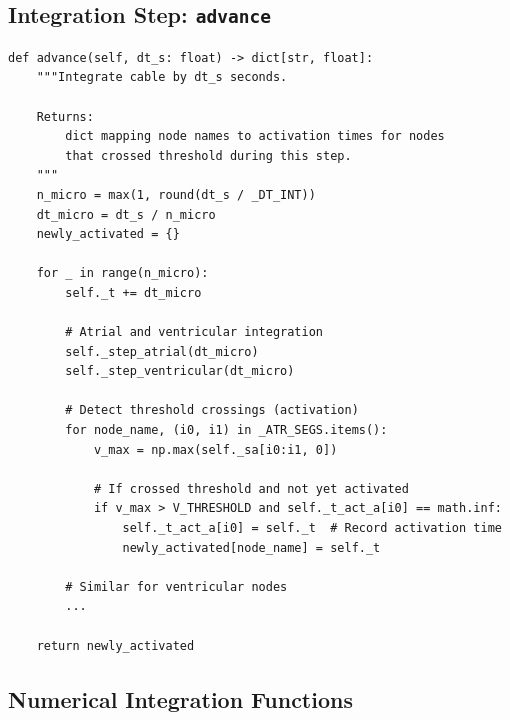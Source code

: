 \documentclass[12pt,a4paper,oneside]{book}
\begin{document}
\subsection{Integration Step: \texttt{advance}}

\begin{Verbatim}[formatcom=\color{black}]
def advance(self, dt_s: float) -> dict[str, float]:
    """Integrate cable by dt_s seconds.
    
    Returns:
        dict mapping node names to activation times for nodes
        that crossed threshold during this step.
    """
    n_micro = max(1, round(dt_s / _DT_INT))
    dt_micro = dt_s / n_micro
    newly_activated = {}
    
    for _ in range(n_micro):
        self._t += dt_micro
        
        # Atrial and ventricular integration
        self._step_atrial(dt_micro)
        self._step_ventricular(dt_micro)
        
        # Detect threshold crossings (activation)
        for node_name, (i0, i1) in _ATR_SEGS.items():
            v_max = np.max(self._sa[i0:i1, 0])
            
            # If crossed threshold and not yet activated
            if v_max > V_THRESHOLD and self._t_act_a[i0] == math.inf:
                self._t_act_a[i0] = self._t  # Record activation time
                newly_activated[node_name] = self._t
        
        # Similar for ventricular nodes
        ...
    
    return newly_activated
\end{Verbatim}

\subsection{Numerical Integration Functions}
\end{document}

